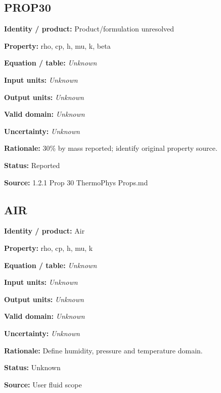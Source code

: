 \documentclass[11pt]{article}
\begin{document}
\begin{minipage}{\textwidth}\small\setlength{\parskip}{2pt}
\subsection*{PROP30}
\textbf{Identity / product:} Product/formulation unresolved\par
\textbf{Property:} rho, cp, h, mu, k, beta\par
\textbf{Equation / table:} \textit{Unknown}\par
\textbf{Input units:} \textit{Unknown}\par
\textbf{Output units:} \textit{Unknown}\par
\textbf{Valid domain:} \textit{Unknown}\par
\textbf{Uncertainty:} \textit{Unknown}\par
\textbf{Rationale:} 30\% by mass reported; identify original property source.\par
\textbf{Status:} Reported\par
\textbf{Source:} 1.2.1 Prop 30 ThermoPhys Props.md\par
\end{minipage}\par\vspace{5pt}
\begin{minipage}{\textwidth}\small\setlength{\parskip}{2pt}
\subsection*{AIR}
\textbf{Identity / product:} Air\par
\textbf{Property:} rho, cp, h, mu, k\par
\textbf{Equation / table:} \textit{Unknown}\par
\textbf{Input units:} \textit{Unknown}\par
\textbf{Output units:} \textit{Unknown}\par
\textbf{Valid domain:} \textit{Unknown}\par
\textbf{Uncertainty:} \textit{Unknown}\par
\textbf{Rationale:} Define humidity, pressure and temperature domain.\par
\textbf{Status:} Unknown\par
\textbf{Source:} User fluid scope\par
\end{minipage}\par\vspace{5pt}
\end{document}
